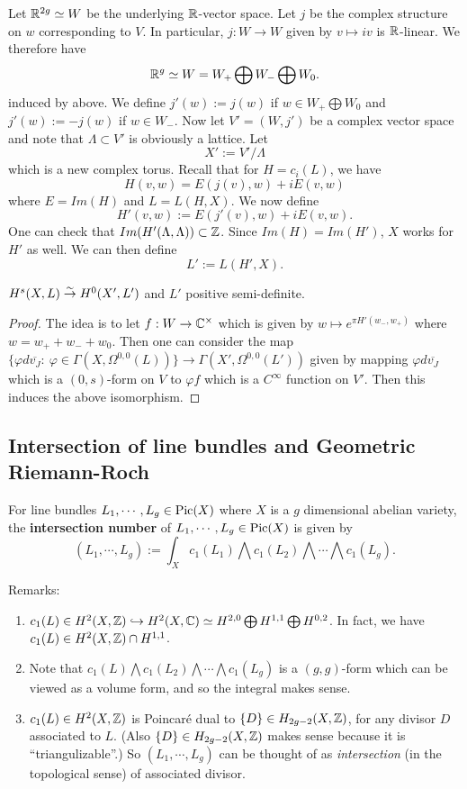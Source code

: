 Let ${\mathbb R}^{2g}\simeq W$ be the underlying ${\mathbb R}$-vector space. Let $j$ be the complex structure on $w$ corresponding to $V$. In particular, $j:W\to W$ given by $v\mapsto iv$ is ${\mathbb R}$-linear. We therefore have 
$${\mathbb R}^g\simeq W = W_+\bigoplus W_- \bigoplus W_0.$$
induced by above. We define $j'(w):=j(w)$ if $w\in W_+\bigoplus W_0$ and $j'(w):=-j(w)$ if $w\in W_-$. Now let $V'=(W,j')$ be a complex vector space and note that $\Lambda\subset V'$ is obviously a lattice. Let 
$$X':=V'/\Lambda$$
which is a new complex torus. Recall that for $H=c_i(L)$, we have 
$$H(v,w)=E(j(v),w)+i E(v,w)$$
where $E=Im(H)$ and $L=L(H,X)$. We now define 
$$H'(v,w):=E(j'(v),w)+iE(v,w).$$
One can check that $Im(H'(\Lambda,\Lambda))\subset {\mathbb Z}$. Since $Im(H)=Im(H')$, $X$ works for $H'$ as well. We can then define
$$L':=L(H',X).$$

\begin{theorem}
$H^s(X,L)\overset{\sim}{\rightarrow} H^0(X',L')$ and $L'$ positive semi-definite. 
\end{theorem}

\begin{proof}
The idea is to let $f:W\to {\mathbb C}^\times$ which is given by $w\mapsto e^{\pi H'(w_-,w_+)}$ where $w=w_+ + w_- +w_0$. Then one can consider the map $\{\varphi d\overline{v_J}:\ \varphi\in \Gamma(X,\Omega^{0,0}(L))\}\to \Gamma(X',\Omega^{0,0}(L'))$ given by mapping $\varphi d\overline{v_J}$ which is a $(0,s)$-form on $V$ to $\varphi f$ which is a $C^\infty$ function on $V'$. Then this induces the above isomorphism.
\end{proof}

\subsection{Intersection of line bundles and Geometric Riemann-Roch}

\begin{definition}
For line bundles $L_1,\cdots, L_g\in \operatorname{Pic}(X)$ where $X$ is a $g$ dimensional abelian variety, the \textbf{intersection number} of $L_1,\cdots, L_g\in \operatorname{Pic}(X)$ is given by
$$(L_1,\cdots,L_g):=\int_X c_1(L_1)\bigwedge c_1(L_2)\bigwedge \cdots \bigwedge c_1(L_g).$$
\end{definition}

Remarks: 
\begin{enumerate}
\item $c_1(L)\in H^2(X,{\mathbb Z})\hookrightarrow H^2(X,{\mathbb C})\simeq H^{2,0}\bigoplus H^{1,1}\bigoplus H^{0,2}$. In fact, we have $c_1(L)\in H^2(X,{\mathbb Z})\cap H^{1,1}$. 
\item Note that $c_1(L)\bigwedge c_1(L_2)\bigwedge \cdots \bigwedge c_1(L_g)$ is a $(g,g)$-form which can be viewed as a volume form, and so the integral makes sense.
\item $c_1(L)\in H^2(X,{\mathbb Z})$ is Poincar\'{e} dual to $\{D\}\in H_{2g-2}(X,{\mathbb Z})$, for any divisor $D$ associated to $L$. (Also $\{D\}\in H_{2g-2}(X,{\mathbb Z})$ makes sense because it is ``triangulizable''.) So $(L_1,\cdots, L_g)$ can be thought of as \emph{intersection} (in the topological sense) of associated divisor.
\end{enumerate}

